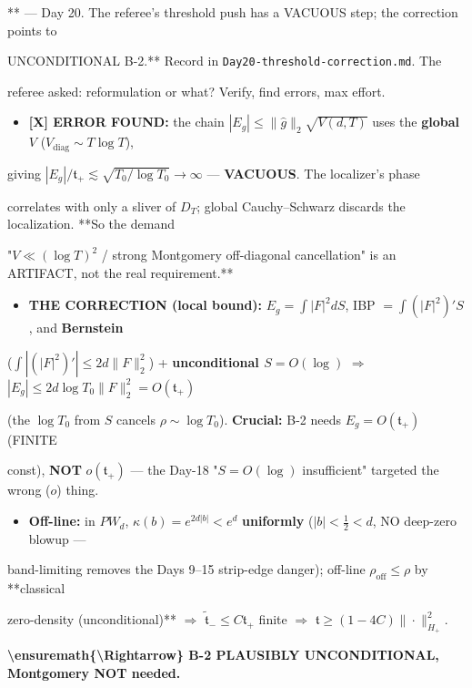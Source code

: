 \documentclass[10pt]{article}
\begin{document}
** --- Day 20. The referee's threshold push has a VACUOUS step; the correction points to\par
UNCONDITIONAL B-2.** Record in \texttt{Day20-threshold-correction.md}. The\par
referee asked: reformulation or what? Verify, find errors, max effort.\par
\begin{itemize}
\item \textbf{[X] ERROR FOUND:} the chain $|E_g|\le\|\widehat g\|_2\sqrt{V(d,T)}$ uses the \textbf{global} $V$ ($V_{\mathrm{diag}}\sim T\log T$),
\end{itemize}
  giving $|E_g|/\mathfrak t_+\lesssim\sqrt{T_0/\log T_0}\to\infty$ --- \textbf{VACUOUS}. The localizer's phase\par
  correlates with only a sliver of $D_T$; global Cauchy--Schwarz discards the localization. **So the demand\par
  "$V\ll(\log T)^2$ / strong Montgomery off-diagonal cancellation" is an ARTIFACT, not the real requirement.**\par
\begin{itemize}
\item \textbf{THE CORRECTION (local bound):} $E_g=\int|F|^2 dS$, IBP $=\int(|F|^2)'S$, and \textbf{Bernstein}
\end{itemize}
  ($\int|(|F|^2)'|\le2d\|F\|_2^2$) + \textbf{unconditional $S=O(\log)$} \ensuremath{\Rightarrow} $|E_g|\le2d\log T_0\|F\|_2^2=O(\mathfrak t_+)$\par
  (the $\log T_0$ from $S$ cancels $\rho\sim\log T_0$). \textbf{Crucial:} B-2 needs $E_g=O(\mathfrak t_+)$ (FINITE\par
  const), \textbf{NOT} $o(\mathfrak t_+)$ --- the Day-18 "$S=O(\log)$ insufficient" targeted the wrong ($o$) thing.\par
\begin{itemize}
\item \textbf{Off-line:} in $PW_d$, $\kappa(b)=e^{2d|b|}<e^d$ \textbf{uniformly} ($|b|<\tfrac12<d$, NO deep-zero blowup ---
\end{itemize}
  band-limiting removes the Days 9--15 strip-edge danger); off-line $\rho_{\mathrm{off}}\le\rho$ by **classical\par
  zero-density (unconditional)** \ensuremath{\Rightarrow} $\widetilde{\mathfrak t}_-\le C\mathfrak t_+$ finite \ensuremath{\Rightarrow} $\mathfrak t\ge(1-4C)\|\cdot\|^2_{H_+}$.\par
  \textbf{\textbackslash{}ensuremath\{\textbackslash{}Rightarrow\} B-2 PLAUSIBLY UNCONDITIONAL, Montgomery NOT needed.}\par
\end{document}

